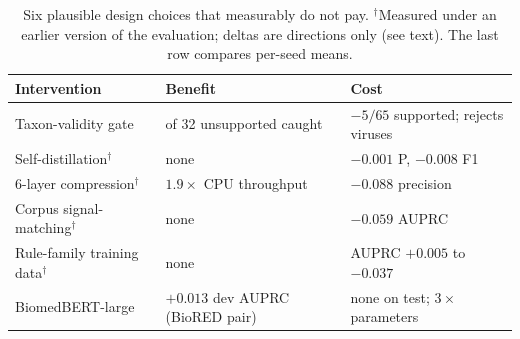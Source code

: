 \documentclass[11pt]{article}
\begin{document}
\begin{table}[h]\centering\small
\setlength{\tabcolsep}{3pt}
\begin{tabular}{@{}l>{\raggedright\arraybackslash}p{}>{\raggedright\arraybackslash}p{}@{}}
\toprule
Intervention & Benefit & Cost \\
\midrule
Taxon-validity gate & 1 of 32 unsupported caught & $-5/65$ supported; rejects viruses \\
Self-distillation$^\dagger$ & none & $-0.001$ P, $-0.008$ F1 \\
6-layer compression$^\dagger$ & $1.9\times$ CPU throughput & $-0.088$ precision \\
Corpus signal-matching$^\dagger$ & none & $-0.059$ AUPRC \\
Rule-family training data$^\dagger$ & none & AUPRC $+0.005$ to $-0.037$ \\
BiomedBERT-large & $+0.013$ dev AUPRC (BioRED pair) & none on test; $3\times$ parameters \\
\bottomrule
\end{tabular}
\caption{Six plausible design choices that measurably do not pay. $^\dagger$Measured under an earlier
version of the evaluation; deltas are directions only (see text). The last row compares per-seed means.}
\label{tab:negative}
\end{table}
\end{document}
